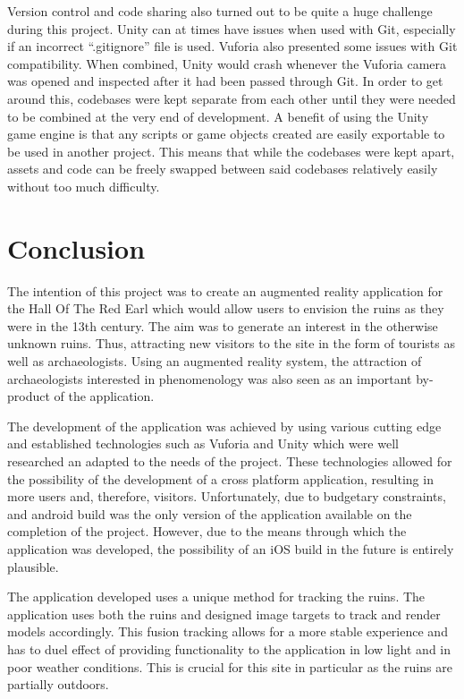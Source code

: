 Version control and code sharing also turned out to be quite a huge challenge during this project. Unity can at times have issues when used with Git, especially if an incorrect “.gitignore” file is used. Vuforia also presented some issues with Git compatibility. When combined, Unity would crash whenever the Vuforia camera was opened and inspected after it had been passed through Git. In order to get around this, codebases were kept separate from each other until they were needed to be combined at the very end of development. A benefit of using the Unity game engine is that any scripts or game objects created are easily exportable to be used in another project. This means that while the codebases were kept apart, assets and code can be freely swapped between said codebases relatively easily without too much difficulty.

\chapter{Conclusion}
The intention of this project was to create an augmented reality application for the Hall Of The Red Earl which would allow users to envision the ruins as they were in the 13th century. The aim was to generate an interest in the otherwise unknown ruins. Thus, attracting new visitors to the site in the form of tourists as well as archaeologists. Using an augmented reality system, the attraction of archaeologists interested in phenomenology was also seen as an important by-product of the application.

The development of the application was achieved by using various cutting edge and established technologies such as Vuforia and Unity which were well researched an adapted to the needs of the project.
These technologies allowed for the possibility of the development of a cross platform application, resulting in more users and, therefore, visitors. Unfortunately, due to budgetary constraints, and android build was the only version of the application available on the completion of the project. However, due to the means through which the application was developed, the possibility of an iOS build in the future is entirely plausible.

The application developed uses a unique method for tracking the ruins. The application uses both the ruins and designed image targets to track and render models accordingly. This fusion tracking allows for a more stable experience and has to duel effect of providing functionality to the application in low light and in poor weather conditions. This is crucial for this site in particular as the ruins are partially outdoors.

